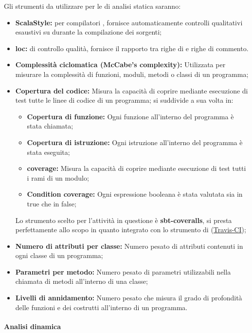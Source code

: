 \documentclass{scalatekids-article}
\begin{document}
Gli strumenti da utilizzare per le  di analisi statica saranno:
\begin{itemize}
\item\textbf{ScalaStyle:}  per compilatori , fornisce automaticamente controlli qualitativi esaustivi su  durante la compilazione dei sorgenti;
\item\textbf{loc:}  di controllo qualità, fornisce il rapporto tra righe di  e righe di commento.
\item\textbf{Complessità ciclomatica (McCabe's complexity):} Utilizzata per
  misurare la complessità di funzioni, moduli, metodi o classi di un
  programma;
\item\textbf{Copertura del codice:} Misura la capacità di coprire mediante
  esecuzione di test tutte le linee di codice di un programma; si
  suddivide a sua volta in:
  \begin{itemize}
  \item\textbf{Copertura di funzione:} Ogni funzione all'interno del
    programma è stata chiamata;
  \item\textbf{Copertura di istruzione:} Ogni istruzione all'interno
    del programma è stata eseguita;
  \item\textbf{ coverage:} Misura la capacità di coprire
    mediante esecuzione di test tutti i rami di un modulo;
  \item\textbf{Condition coverage:} Ogni espressione booleana è stata
    valutata sia in true che in false;
  \end{itemize}
  Lo strumento scelto per l'attività in questione è \textbf{sbt-coveralls}, si
  presta perfettamente allo scopo in quanto integrato con lo strumento di
   (\hyperref[sec:travis]{Travis-CI});
\item\textbf{Numero di attributi per classe:} Numero pesato di attributi
  contenuti in ogni classe di un programma;
\item\textbf{Parametri per metodo:} Numero pesato di parametri utilizzabili
  nella chiamata di metodi all'interno di una classe;
\item\textbf{Livelli di annidamento:} Numero pesato che misura il grado di
  profondità delle funzioni e dei costrutti all'interno di un programma.
\end{itemize}

\paragraph{Analisi dinamica}
\end{document}
